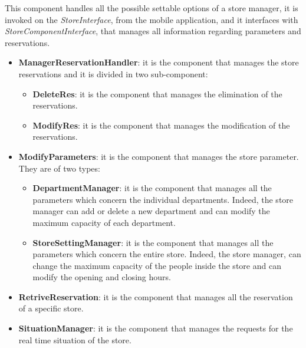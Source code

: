\documentclass{article}
\begin{document}
			This component handles all the possible settable options of a store manager, it is invoked on the \emph{StoreInterface}, from the mobile application, and it interfaces with \emph{StoreComponentInterface}, that manages all information regarding parameters and reservations.
			
			\begin{itemize}
				\item {\bfseries ManagerReservationHandler}: it is the component that manages the store reservations and it is divided in two sub-component:
				
				\begin{itemize}
					\item {\bfseries DeleteRes}: it is the component that manages the elimination of the reservations.
					\item {\bfseries ModifyRes}: it is the component that manages the modification of the reservations.
				\end{itemize}
				
				\item {\bfseries ModifyParameters}: it is the component that manages the store parameter. They are of two types:
				
				\begin{itemize}
					\item {\bfseries DepartmentManager}: it is the component that manages all the parameters which concern the individual departments. Indeed, the store manager can add or delete a new department and can modify the maximum capacity of each department.
					\item {\bfseries StoreSettingManager}: it is the component that manages all the parameters which concern the entire store. Indeed, the store manager, can change the maximum capacity of the people inside the store and can modify the opening and closing hours.
				\end{itemize}
			
				\item {\bfseries RetriveReservation}: it is the component that manages all the reservation of a specific store.
				
				\item {\bfseries SituationManager}: it is the component that manages the requests for the real time situation of the store.
			\end{itemize}
		
\end{document}

